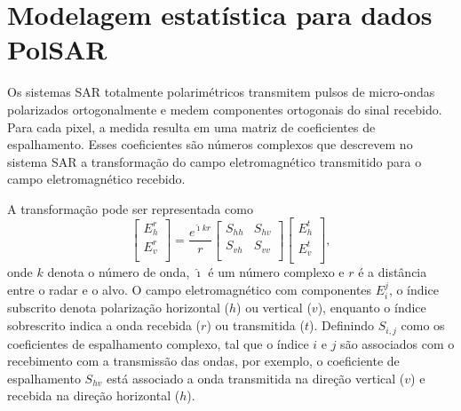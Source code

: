 \documentclass[conference]{IEEEtran}
\begin{document}
\section{Modelagem estatística para dados PolSAR}
Os sistemas SAR totalmente polarimétricos transmitem pulsos de micro-ondas polarizados ortogonalmente e medem componentes ortogonais do sinal recebido. Para cada pixel, a medida resulta em uma matriz de coeficientes de espalhamento. Esses coeficientes são números complexos que descrevem no sistema SAR a transformação do campo eletromagnético transmitido para o campo eletromagnético recebido.

A transformação pode ser representada como
\begin{equation}
 \left[
\begin{array}{c}
	E_{h}^{r}   \\
	E_{v}^{r}    \\
\end{array}
\right]
 = \frac{e^{\hat{\imath} kr}}{r}\left[
\begin{array}{cc}
	S_{hh}   & S_{hv}   \\
	S_{vh}   & S_{vv}   \\
\end{array}
\right]
 \left[
\begin{array}{c}
	E_{h}^{t}   \\
	E_{v}^{t}    \\
\end{array}
\right],
\end{equation}
onde $k$ denota o número de onda, $\hat{\imath}$ é um número complexo e $r$ é a distância entre o radar e o alvo. O campo eletromagnético com componentes $E_{i}^{j}$, o índice subscrito denota polarização horizontal ($h$) ou vertical ($v$),  enquanto o índice sobrescrito indica a onda recebida ($r$) ou transmitida ($t$). Definindo $S_{i,j}$ como os coeficientes de espalhamento complexo, tal que o índice $i$ e $j$ são associados com o recebimento com a transmissão das ondas, por exemplo, o coeficiente de espalhamento $S_{hv}$ está associado a onda transmitida na direção vertical ($v$) e recebida na direção horizontal ($h$).
\end{document}
